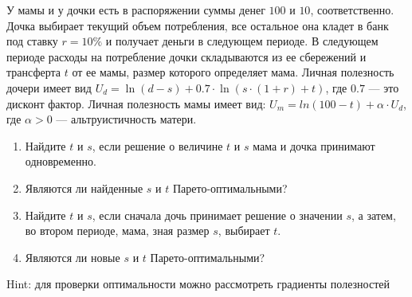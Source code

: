 \begin{problem}
\begin{source} \cite[3.11]{gintis:gte} \end{source}
У мамы и у дочки есть в распоряжении суммы денег  $100$  и  $10$, соответственно. Дочка выбирает текущий объем потребления, все остальное она кладет в банк под ставку  $r=10\%$  и получает деньги в следующем периоде. В следующем периоде расходы на потребление дочки складываются из ее сбережений и трансферта  $t$  от ее мамы, размер которого определяет мама. Личная полезность дочери имеет вид  $U_{d} =\ln(d-s)+0.7\cdot \ln(s\cdot(1+r)+t)$, где  $0.7$  --- это дисконт фактор. Личная полезность мамы имеет вид:  $U_{m} =ln(100-t)+\alpha \cdot U_{d} $, где  $\alpha >0$  --- альтруистичность матери. \par
\begin{enumerate}
\item  Найдите $t$ и $s$, если решение о величине $t$ и $s$ мама и дочка принимают одновременно. \par
\item Являются ли найденные $s$ и $t$ Парето-оптимальными? \par
\item  Найдите $t$ и $s$, если сначала дочь принимает решение о значении $s$, а затем, во втором периоде, мама, зная размер $s$, выбирает $t$. \par
\item Являются ли новые $s$ и $t$ Парето-оптимальными? \par
\end{enumerate}
\begin{rem} 
Hint: для проверки оптимальности можно рассмотреть градиенты полезностей \par
\end{rem}




\begin{sol}

\end{sol}
\end{problem}



